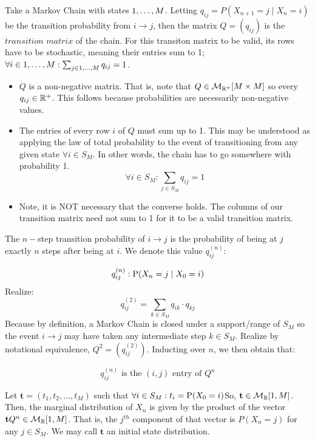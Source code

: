 \begin{definition} 
Take a Markov Chain with states $\oneto[M]$. Letting $q_{ij} = P(X_{n+1} = j \mid X_n = i)$ be the transition probability from $i \to j$, then the matrix $Q=(q_{ij})$ is the $\textit{transition matrix}$ of the chain. For this transiton matrix to be valid, its rows have to be stochastic, meaning their entries sum to 1; $\forall i \in \oneto[M]: \sum_{j \in \oneto[M]} q_{ij} = 1$.
\end{definition}

\begin{itemize}
\item $Q$ is a non-negative matrix. That is, note that $Q \in \mathcal{M}_{\R^+}[M\times M]$ so every $q_{ij} \in \R^+$. This follows because probabilities are necessarily non-negative values.
\item The entries of every row $i$ of $Q$ must sum up to 1. This may be understood as applying the law of total probability to the event of transitioning from any given state $\forall i \in S_M$. In other words, the chain has to go somewhere with probability 1.
$$\forall i \in S_M: \sum_{j \in S_M} q_{ij} = 1$$
\item Note, it is NOT necessary that the converse holds. The columns of our transition matrix need not sum to 1 for it to be a valid transition matrix.
\end{itemize}

\begin{definition} The $n-$step transition probability of $i \to j$ is the probability of being at $j$ exactly $n$ steps after being at $i$. We denote this value $q_{ij}^{(n)}:$
\end{definition}

$$ q_{ij}^{(n)}: \Prb(X_n = j \mid X_0 = i)$$
Realize: 
$$q_{ij}^{(2)} = \sum_{k \in S_M} q_{ik}\cdot q_{kj}$$
Because by definition, a Markov Chain is closed under a support/range of $S_M$ so the event $i \to j$ may have taken any intermediate step $k \in S_M$. Realize by notational equivalence, $Q^2 = (q_{ij}^{(2)})$. Inducting over $n$, we then obtain that:

$$q_{ij}^{(n)} \text{ is the } (i,j) \text{ entry of } Q^n$$

\begin{definition} Let $\textbf{t} = (t_1,t_2,\dots,t_M)$ such that $\forall i \in S_M : t_i = \Prb(X_0 = i)$So, $\textbf{t} \in \mathcal{M}_{\R}[1,M]$. Then, the marginal distribution of $X_n$ is given by the product of the vector $\textbf{t} Q^n \in \mathcal{M}_{\R}[1,M]$. That is, the $j^{th}$ component of that vector is $P(X_n = j)$ for any $j \in S_M$. We may call $\textbf{t}$ an initial state distribution.
\end{definition}

